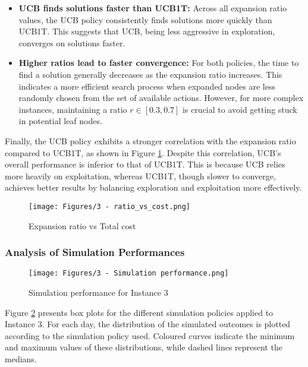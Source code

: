\begin{itemize}
    \item \textbf{UCB finds solutions faster than UCB1T:}
          Across all expansion ratio values, the UCB policy consistently finds solutions more quickly than UCB1T. This suggests that UCB, being less aggressive in exploration, converges on solutions faster.

    \item \textbf{Higher ratios lead to faster convergence:}
          For both policies, the time to find a solution generally decreases as the expansion ratio increases. This indicates a more efficient search process when expanded nodes are less randomly chosen from the set of available actions. However, for more complex instances, maintaining a ratio \( r \in [0.3, 0.7] \) is crucial to avoid getting stuck in potential leaf nodes.
\end{itemize}

Finally, the UCB policy exhibits a stronger correlation with the expansion ratio compared to UCB1T, as shown in Figure \ref{fig:ratio_vs_cost_3}. Despite this correlation, UCB's overall performance is inferior to that of UCB1T. This is because UCB relies more heavily on exploitation, whereas UCB1T, though slower to converge, achieves better results by balancing exploration and exploitation more effectively.

\begin{figure}[!ht]
    \centering
    \texttt{[image: Figures/3 - ratio\_vs\_cost.png]}
    \caption{Expansion ratio vs Total cost}
    \label{fig:ratio_vs_cost_3}
\end{figure}

\subsubsection*{Analysis of Simulation Performances}

\begin{figure}[!ht]
    \centering
    \texttt{[image: Figures/3 - Simulation performance.png]}
    \caption{Simulation performance for Instance 3}
    \label{fig:sim_perf_3}
\end{figure}

Figure \ref{fig:sim_perf_3} presents box plots for the different simulation policies applied to Instance 3. For each day, the distribution of the simulated outcomes is plotted according to the simulation policy used. Coloured curves indicate the minimum and maximum values of these distributions, while dashed lines represent the medians.

